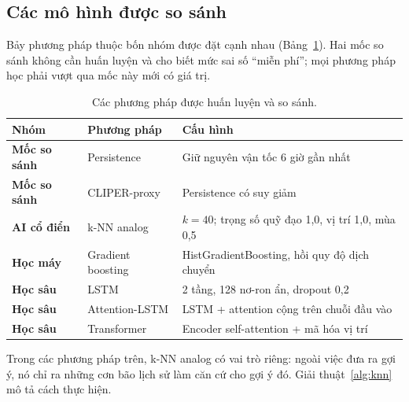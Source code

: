 \subsection{Các mô hình được so sánh}

Bảy phương pháp thuộc bốn nhóm được đặt cạnh nhau (Bảng~\ref{tab:phuongphap}).
Hai mốc so sánh không cần huấn luyện và cho biết mức sai số ``miễn phí''; mọi
phương pháp học phải vượt qua mốc này mới có giá trị.

\begin{table}[H]
\centering
\caption{Các phương pháp được huấn luyện và so sánh.}
\label{tab:phuongphap}
\begin{tabularx}{\textwidth}{>{\bfseries\color{daunavy}}l >{\color{daumaroon}}l X}
\toprule
\rowcolor{gray100}\bfseries\color{daunavy}Nhóm & \bfseries\color{daumaroon}Phương pháp & \leavevmode\bfseries\color{daunavy}Cấu hình \\
\midrule
Mốc so sánh & Persistence & Giữ nguyên vận tốc 6 giờ gần nhất \\
Mốc so sánh & CLIPER-proxy & Persistence có suy giảm \\
AI cổ điển & k-NN analog & $k = 40$; trọng số quỹ đạo 1,0, vị trí 1,0, mùa 0,5 \\
Học máy & Gradient boosting & HistGradientBoosting, hồi quy độ dịch chuyển \\
Học sâu & LSTM & 2 tầng, 128 nơ-ron ẩn, dropout 0,2 \\
Học sâu & Attention-LSTM & LSTM + attention cộng trên chuỗi đầu vào \\
Học sâu & Transformer & Encoder self-attention + mã hóa vị trí \\
\bottomrule
\end{tabularx}
\end{table}

Trong các phương pháp trên, k-NN analog có vai trò riêng: ngoài việc đưa ra
gợi ý, nó chỉ ra những cơn bão lịch sử làm căn cứ cho gợi ý đó.
Giải thuật~\ref{alg:knn} mô tả cách thực hiện.

